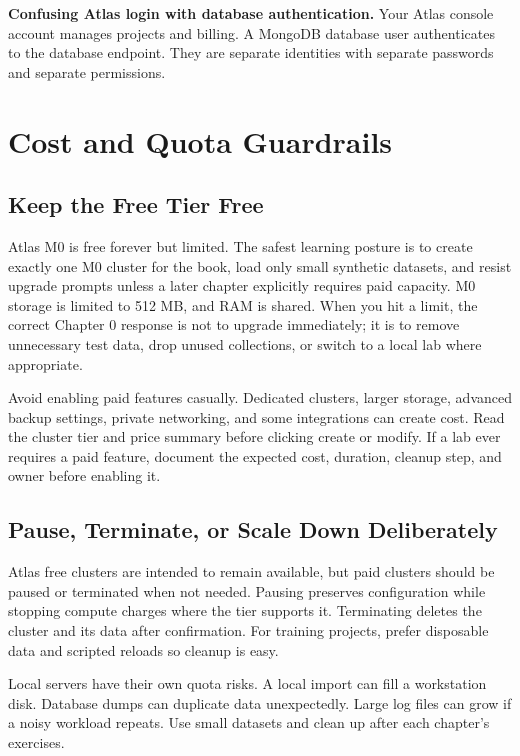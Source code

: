 \begin{pitfall}
\textbf{Confusing Atlas login with database authentication.} Your Atlas console account manages projects and billing. A MongoDB database user authenticates to the database endpoint. They are separate identities with separate passwords and separate permissions.
\end{pitfall}

\section{Cost and Quota Guardrails}
\subsection{Keep the Free Tier Free}
Atlas M0 is free forever but limited. The safest learning posture is to create exactly one M0 cluster for the book, load only small synthetic datasets, and resist upgrade prompts unless a later chapter explicitly requires paid capacity. M0 storage is limited to 512 MB, and RAM is shared. When you hit a limit, the correct Chapter 0 response is not to upgrade immediately; it is to remove unnecessary test data, drop unused collections, or switch to a local lab where appropriate.

Avoid enabling paid features casually. Dedicated clusters, larger storage, advanced backup settings, private networking, and some integrations can create cost. Read the cluster tier and price summary before clicking create or modify. If a lab ever requires a paid feature, document the expected cost, duration, cleanup step, and owner before enabling it.

\subsection{Pause, Terminate, or Scale Down Deliberately}
Atlas free clusters are intended to remain available, but paid clusters should be paused or terminated when not needed. Pausing preserves configuration while stopping compute charges where the tier supports it. Terminating deletes the cluster and its data after confirmation. For training projects, prefer disposable data and scripted reloads so cleanup is easy.

Local servers have their own quota risks. A local import can fill a workstation disk. Database dumps can duplicate data unexpectedly. Large log files can grow if a noisy workload repeats. Use small datasets and clean up after each chapter's exercises.

